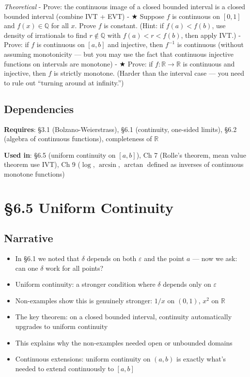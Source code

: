 \documentclass[
  10pt,
  letterpaper,
]{scrbook}
\providecommand{\tightlist}{%
  \setlength{\itemsep}{0pt}\setlength{\parskip}{0pt}}
\newcommand{\QQ}{\mathbb{Q}}
\newcommand{\RR}{\mathbb{R}}
\begin{document}
\emph{Theoretical} - Prove: the continuous image of a closed bounded
interval is a closed bounded interval (combine IVT + EVT) - ★ Suppose
\(f\) is continuous on \([0,1]\) and \(f(x) \in \QQ\) for all \(x\).
Prove \(f\) is constant. (Hint: if \(f(a) < f(b)\), use density of
irrationals to find \(r \notin \QQ\) with \(f(a) < r < f(b)\), then
apply IVT.) - Prove: if \(f\) is continuous on \([a,b]\) and injective,
then \(f^{-1}\) is continuous (without assuming monotonicity --- but you
may use the fact that continuous injective functions on intervals are
monotone) - ★ Prove: if \(f: \RR \to \RR\) is continuous and injective,
then \(f\) is strictly monotone. (Harder than the interval case --- you
need to rule out ``turning around at infinity.'')

\subsection{Dependencies}\label{dependencies-27}

\textbf{Requires}: §3.1 (Bolzano-Weierstrass), §6.1 (continuity,
one-sided limits), §6.2 (algebra of continuous functions), completeness
of \(\RR\)

\textbf{Used in}: §6.5 (uniform continuity on \([a,b]\)), Ch 7 (Rolle's
theorem, mean value theorem use IVT), Ch 9 (\(\log\), \(\arcsin\),
\(\arctan\) defined as inverses of continuous monotone functions)

\section{§6.5 Uniform Continuity}\label{uniform-continuity}

\subsection{Narrative}\label{narrative-28}

\begin{itemize}
\tightlist
\item
  In §6.1 we noted that \(\delta\) depends on both \(\varepsilon\) and
  the point \(a\) --- now we ask: can one \(\delta\) work for all
  points?
\item
  Uniform continuity: a stronger condition where \(\delta\) depends only
  on \(\varepsilon\)
\item
  Non-examples show this is genuinely stronger: \(1/x\) on \((0,1)\),
  \(x^2\) on \(\RR\)
\item
  The key theorem: on a closed bounded interval, continuity
  automatically upgrades to uniform continuity
\item
  This explains why the non-examples needed open or unbounded domains
\item
  Continuous extensions: uniform continuity on \((a,b)\) is exactly
  what's needed to extend continuously to \([a,b]\)
\end{itemize}
\end{document}
